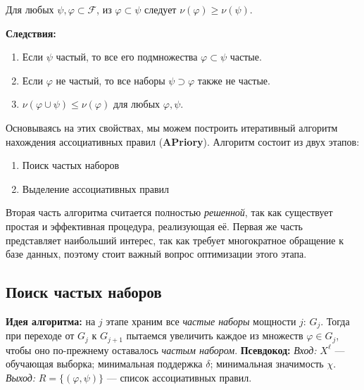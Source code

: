 Для любых \( \psi, \varphi \subset \mathcal{F} \), из \( \varphi \subset \psi \) следует \( \nu(\varphi) \geq \nu(\psi) \).

\textbf{Следствия:}

\begin{enumerate}
    \item Если \( \psi \) частый, то все его подмножества \( \varphi \subset \psi \) частые.
    \item Если \( \varphi \) не частый, то все наборы \( \psi \supset \varphi \) также не частые.
    \item \( \nu(\varphi \cup \psi) \leq \nu(\varphi) \) для любых \( \varphi, \psi \).
\end{enumerate}

Основываясь на этих свойствах, мы можем построить итеративный алгоритм нахождения ассоциативных правил (\textbf{APriory}). Алгоритм состоит из двух этапов:

\begin{enumerate}
    \item Поиск частых наборов
    \item Выделение ассоциативных правил
\end{enumerate}

Вторая часть алгоритма считается полностью \textit{решенной}, так как существует простая и эффективная процедура, реализующая её. Первая же часть представляет наибольший интерес, так как требует многократное обращение к базе данных, поэтому стоит важный вопрос оптимизации этого этапа.

\subsection{Поиск частых наборов}

\textbf{Идея алгоритма:} на \( j\) этапе храним все \textit{частые наборы} мощности \(j\): \(G_j\). Тогда при переходе от \(G_j\) к \(G_{j+1}\) пытаемся увеличить каждое из множеств \(\varphi \in G_j\), чтобы оно по-прежнему оставалось \textit{частым набором}.
\newline\newline
\textbf{Псевдокод:}
\newline
\textit{Вход:} \( X^\ell \) — обучающая выборка; минимальная поддержка \( \delta \); минимальная значимость \( \chi \).
\newline
\textit{Выход:} \( R = \{(\varphi, \psi)\} \) — список ассоциативных правил.

